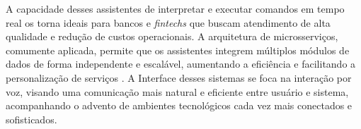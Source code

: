 A capacidade desses assistentes de interpretar e executar comandos em tempo real os torna ideais para bancos e \textit{fintechs} que buscam atendimento de alta qualidade e redução de custos operacionais. A arquitetura de microsserviços, comumente aplicada, permite que os assistentes integrem múltiplos módulos de dados de forma independente e escalável, aumentando a eficiência e facilitando a personalização de serviços \cite{villamizar_evaluating_2023}. A Interface desses sistemas se foca na interação por voz, visando uma comunicação mais natural e eficiente entre usuário e sistema, acompanhando o advento de ambientes tecnológicos cada vez mais conectados e sofisticados.